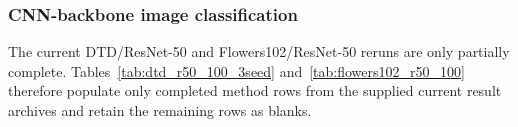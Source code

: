 \documentclass[pdflatex,sn-mathphys-num]{sn-jnl}
\theoremstyle{thmstyleone}
\theoremstyle{thmstyletwo}
\theoremstyle{thmstylethree}
\begin{document}
\FloatBarrier
\subsubsection{CNN-backbone image classification}

The current DTD/ResNet-50 and Flowers102/ResNet-50 reruns are only partially complete. Tables~\ref{tab:dtd_r50_100_3seed} and~\ref{tab:flowers102_r50_100} therefore populate only completed method rows from the supplied current result archives and retain the remaining rows as blanks.

\begin{table}[!t]
\centering
\caption{Current three-seed comparison on DTD with an ImageNet-pretrained ResNet-50 backbone trained for 100 epochs using batch size 128. Values are populated only for completed rows in the supplied current result set; all other cells are intentionally left blank.}
\label{tab:dtd_r50_100_3seed}
\scriptsize
\setlength{\tabcolsep}{2.6pt}
\renewcommand{\arraystretch}{1.08}


\end{table}
\end{document}
